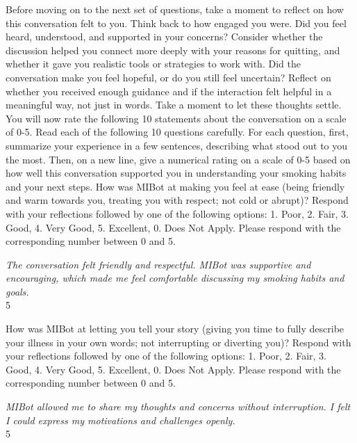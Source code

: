 \begin{researcherbox}
Before moving on to the next set of questions, take a moment to reflect on how this conversation felt to you. Think back to how engaged you were. Did you feel heard, understood, and supported in your concerns? Consider whether the discussion helped you connect more deeply with your reasons for quitting, and whether it gave you realistic tools or strategies to work with. Did the conversation make you feel hopeful, or do you still feel uncertain? Reflect on whether you received enough guidance and if the interaction felt helpful in a meaningful way, not just in words. Take a moment to let these thoughts settle. You will now rate the following 10 statements about the conversation on a scale of 0-5. Read each of the following 10 questions carefully. For each question, first, summarize your experience in a few sentences, describing what stood out to you the most. Then, on a new line, give a numerical rating on a scale of 0-5 based on how well this conversation supported you in understanding your smoking habits and your next steps. How was MIBot at making you feel at ease (being friendly and warm towards you, treating you with respect; not cold or abrupt)? Respond with your reflections followed by one of the following options: 1. Poor, 2. Fair, 3. Good, 4. Very Good, 5. Excellent, 0. Does Not Apply. Please respond with the corresponding number between 0 and 5.
\end{researcherbox}

\begin{clientbox}
\textit{The conversation felt friendly and respectful. MIBot was supportive and encouraging, which made me feel comfortable discussing my smoking habits and goals.} \\
5
\end{clientbox}

\begin{researcherbox}
How was MIBot at letting you tell your story (giving you time to fully describe your illness in your own words; not interrupting or diverting you)? Respond with your reflections followed by one of the following options: 1. Poor, 2. Fair, 3. Good, 4. Very Good, 5. Excellent, 0. Does Not Apply. Please respond with the corresponding number between 0 and 5.
\end{researcherbox}

\begin{clientbox}
\textit{MIBot allowed me to share my thoughts and concerns without interruption. I felt I could express my motivations and challenges openly.} \\
5
\end{clientbox}

